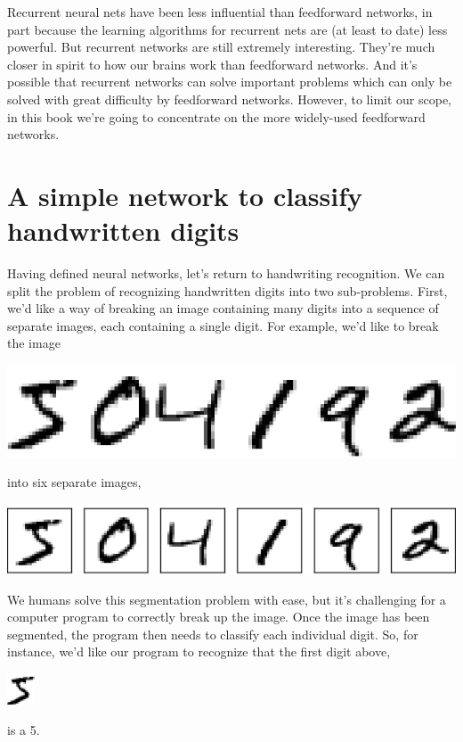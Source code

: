 \documentclass[a4paper,12pt]{report}%
\begin{document}
Recurrent neural nets have been less influential than feedforward networks, in part because the learning algorithms for recurrent nets are (at least to date) less powerful. But recurrent networks are still extremely interesting. They're much closer in spirit to how our brains work than feedforward networks. And it's possible that recurrent networks can solve important problems which can only be solved with great difficulty by feedforward networks. However, to limit our scope, in this book we're going to concentrate on the more widely-used feedforward networks.

\section{A simple network to classify handwritten digits}
Having defined neural networks, let's return to handwriting recognition. We can split the problem of recognizing handwritten digits into two sub-problems. First, we'd like a way of breaking an image containing many digits into a sequence of separate images, each containing a single digit. For example, we'd like to break the image
\begin{center}
 \includegraphics[width=0.4\linewidth]{images/digits.png}
\end{center}

into six separate images,
\begin{center}
 \includegraphics[width=0.5\linewidth]{images/digits_separate.png}
\end{center}

We humans solve this segmentation problem with ease, but it's challenging for a computer program to correctly break up the image. Once the image has been segmented, the program then needs to classify each individual digit. So, for instance, we'd like our program to recognize that the first digit above,
\begin{center}
 \includegraphics[width=0.05\linewidth]{images/mnist_first_digit.png}
\end{center}
is a 5.
\end{document}
